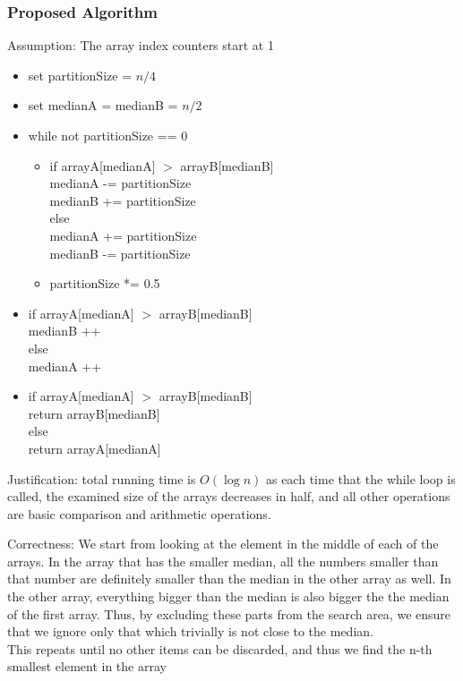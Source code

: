 \documentclass{article}
\begin{document}
\subsubsection*{Proposed Algorithm}
Assumption: The array index counters start at 1
\begin{itemize}
  \item set partitionSize = $n/4$
  \item set medianA = medianB = $n/2$
  \item while not partitionSize == 0
  \begin{itemize}
    \item if arrayA[medianA] $>$ arrayB[medianB]\\
    medianA -= partitionSize\\
    medianB += partitionSize\\
    else\\
    medianA += partitionSize\\
    medianB -= partitionSize
    \item partitionSize *= 0.5
  \end{itemize}
  \item if arrayA[medianA] $>$ arrayB[medianB]\\
  medianB ++\\
  else\\
  medianA ++
  \item if arrayA[medianA] $>$ arrayB[medianB]\\
  return arrayB[medianB]\\
  else\\
  return arrayA[medianA]
\end{itemize}

Justification: total running time is $O(\log n)$ as each time that the while
loop is called, the examined size of the arrays decreases in half, and all other
operations are basic comparison and arithmetic operations.

Correctness: We start from looking at the element in the middle of each of the
arrays. In the array that has the smaller median, all the  numbers smaller than
that number are definitely smaller than the median in the other array as well.
In the other array, everything bigger than the median is also bigger the the median of
the first array. Thus, by excluding these parts from the search area, we ensure
that we ignore only that which trivially is not close to the median.\\
This repeats until no other items can be discarded, and thus we find the n-th
smallest element in the array
\end{document}
